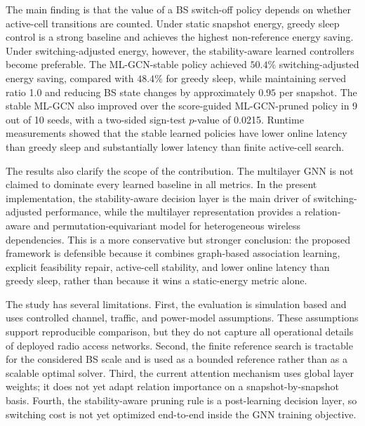 \documentclass[journal]{IEEEtran}
\begin{document}
The main finding is that the value of a BS switch-off policy depends on
whether active-cell transitions are counted. Under static snapshot energy,
greedy sleep control is a strong baseline and achieves the highest
non-reference energy saving. Under switching-adjusted energy, however, the
stability-aware learned controllers become preferable. The ML-GCN-stable
policy achieved $50.4\%$ switching-adjusted energy saving, compared with
$48.4\%$ for greedy sleep, while maintaining served ratio 1.0 and reducing BS
state changes by approximately $0.95$ per snapshot. The stable ML-GCN also
improved over the score-guided ML-GCN-pruned policy in 9 out of 10 seeds, with
a two-sided sign-test $p$-value of 0.0215. Runtime measurements showed that
the stable learned policies have lower online latency than greedy sleep and
substantially lower latency than finite active-cell search.

The results also clarify the scope of the contribution. The multilayer GNN is
not claimed to dominate every learned baseline in all metrics. In the present
implementation, the stability-aware decision layer is the main driver of
switching-adjusted performance, while the multilayer representation provides a
relation-aware and permutation-equivariant model for heterogeneous wireless
dependencies. This is a more conservative but stronger conclusion: the
proposed framework is defensible because it combines graph-based association
learning, explicit feasibility repair, active-cell stability, and lower online
latency than greedy sleep, rather than because it wins a static-energy metric
alone.

The study has several limitations. First, the evaluation is simulation based
and uses controlled channel, traffic, and power-model assumptions. These
assumptions support reproducible comparison, but they do not capture all
operational details of deployed radio access networks. Second, the finite
reference search is tractable for the considered BS scale and is used as a
bounded reference rather than as a scalable optimal solver. Third, the current
attention mechanism uses global layer weights; it does not yet adapt relation
importance on a snapshot-by-snapshot basis. Fourth, the stability-aware pruning
rule is a post-learning decision layer, so switching cost is not yet optimized
end-to-end inside the GNN training objective.
\end{document}
